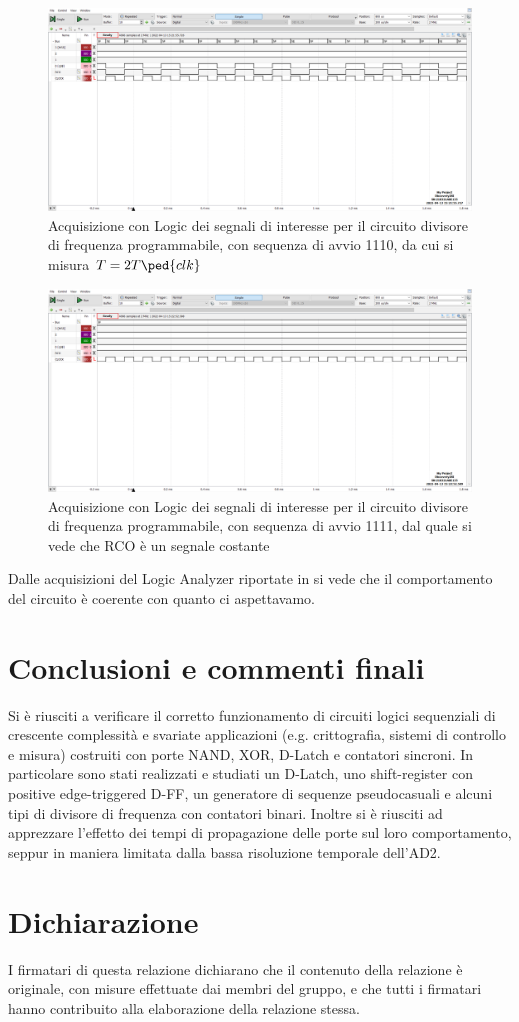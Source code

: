\documentclass[10pt, a4paper, italian]{article}
\begin{document}
\begin{figure}[htbp]
\centering
	\includegraphics[width=\textwidth]{5.f_1110}
	\caption{Acquisizione con Logic dei segnali di interesse per il circuito divisore di frequenza programmabile, con sequenza di avvio 1110, da cui si misura $T = 2 T\ped{clk}$
	 \label{fig: RCO_1110}}
\end{figure}
\begin{figure}[htbp]
\centering
	\includegraphics[width=\textwidth]{5.f_1111}
	\caption{Acquisizione con Logic dei segnali di interesse per il circuito divisore di frequenza programmabile, con sequenza di avvio 1111, dal quale si vede che RCO è un segnale costante \label{fig: RCO_1111}}
\end{figure}

Dalle acquisizioni del Logic Analyzer riportate in si vede che il comportamento
del circuito è coerente con quanto ci aspettavamo.

\section*{Conclusioni e commenti finali}
Si è riusciti a verificare il corretto funzionamento di circuiti logici
sequenziali di crescente complessità e svariate applicazioni (e.g.
crittografia, sistemi di controllo e misura) costruiti con porte NAND, XOR,
D-Latch e contatori sincroni.
In particolare sono stati realizzati e studiati un D-Latch, uno shift-register
con positive edge-triggered D-FF, un generatore di sequenze pseudocasuali e
alcuni tipi di divisore di frequenza con contatori binari.
Inoltre si è riusciti ad apprezzare l'effetto dei tempi di propagazione
delle porte sul loro comportamento, seppur in maniera limitata dalla bassa
risoluzione temporale dell'AD2.

\section*{Dichiarazione}
I firmatari di questa relazione dichiarano che il contenuto della relazione \`e
originale, con misure effettuate dai membri del gruppo, e che tutti i firmatari
hanno contribuito alla elaborazione della relazione stessa.
\end{document}
